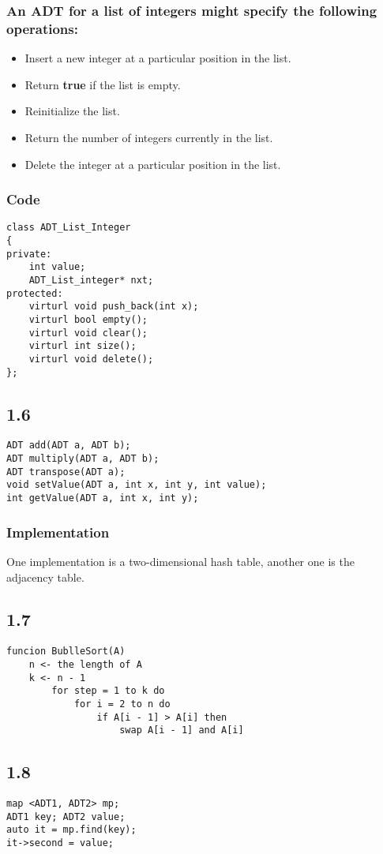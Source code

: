 \documentclass[12pt]{ctexart}
\begin{document}
        \subsubsection*{An ADT for a list of integers might specify the following operations:}
            \begin{itemize}
                \item Insert a new integer at a particular position in the list.
                \item Return \textbf{true} if the list is empty.
                \item Reinitialize the list.
                \item Return the number of integers currently in the list.
                \item Delete the integer at a particular position in the list.
            \end{itemize}

        \subsubsection*{Code}
        \begin{lstlisting}
class ADT_List_Integer
{
private:
    int value;
    ADT_List_integer* nxt;
protected:
    virturl void push_back(int x);
    virturl bool empty();
    virturl void clear();
    virturl int size();
    virturl void delete();
};
        \end{lstlisting}
    
    \subsection*{1.6}
        \begin{lstlisting}
ADT add(ADT a, ADT b);
ADT multiply(ADT a, ADT b);
ADT transpose(ADT a);
void setValue(ADT a, int x, int y, int value);
int getValue(ADT a, int x, int y);
        \end{lstlisting}

        \subsubsection*{Implementation}
        One implementation is a two-dimensional hash table, another one is the adjacency table.

    \subsection*{1.7}
        \begin{lstlisting}
funcion BublleSort(A)
    n <- the length of A
    k <- n - 1
        for step = 1 to k do
            for i = 2 to n do
                if A[i - 1] > A[i] then
                    swap A[i - 1] and A[i]
        \end{lstlisting}

    \subsection*{1.8}
        \begin{lstlisting}
map <ADT1, ADT2> mp;
ADT1 key; ADT2 value;
auto it = mp.find(key);
it->second = value;
        \end{lstlisting}
\end{document}

